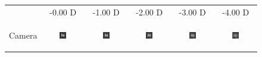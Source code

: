 
\begin{figure}[!t]
	\centering

	\begin{tabular}{@{}r@{ } c@{ } c@{ } c@{ } c@{ } c }
	&
	\small{-0.00 D} &
	\small{-1.00 D} &
	\small{-2.00 D} &
	\small{-3.00 D} &
	\small{-4.00 D} & \\

	\begin{sideways} \parbox[b]{20mm} {Camera} \end{sideways} &
	\includegraphics[width=0.185\textwidth]{__Images/05/BW_N(20-200)_-0D_to_-4D/bw_N_20-200_Camera-0,00D(lens).png} &
	\includegraphics[width=0.185\textwidth]{__Images/05/BW_N(20-200)_-0D_to_-4D/bw_N_20-200_Camera-1,00D(lens).png} &
	\includegraphics[width=0.185\textwidth]{__Images/05/BW_N(20-200)_-0D_to_-4D/bw_N_20-200_Camera-2,00D(lens).png} &
	\includegraphics[width=0.185\textwidth]{__Images/05/BW_N(20-200)_-0D_to_-4D/bw_N_20-200_Camera-3,00D(lens).png} &
	\includegraphics[width=0.185\textwidth]{__Images/05/BW_N(20-200)_-0D_to_-4D/bw_N_20-200_Camera-4,00D(lens).png} \\


\end{tabular}
\end{figure}
